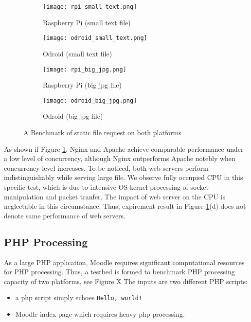 \begin{figure}[h]
\centering
\begin{subfigure}{0.45\textwidth}
\centering
\texttt{[image: rpi\_small\_text.png]}
\caption{Raspberry Pi (small text file)}
\end{subfigure}
\begin{subfigure}{0.45\textwidth}
\centering
\texttt{[image: odroid\_small\_text.png]}
\caption{Odroid (small text file)}
\end{subfigure}

\begin{subfigure}{0.45\textwidth}
\centering
\texttt{[image: rpi\_big\_jpg.png]}
\caption{Raspberry Pi (big jpg file)}
\end{subfigure}
\begin{subfigure}{0.45\textwidth}
\centering
\texttt{[image: odroid\_big\_jpg.png]}
\caption{Odroid (big jpg file)}
\end{subfigure}

\caption{A Benchmark of static file request on both platforms}
\label{static}
\end{figure}
As shown if Figure \ref{static}, Nginx and Apache achieve comparable performance under a low level of concurrency, although Nginx outperforms Apache notebly when concurrency level increases. To be noticed, both web servers perform indistinguishably while serving large file. We observe fully occupied CPU in this specific test, which is due to intensive OS kernel processing of socket manipulation and packet tranfer. The impact of web server on the CPU is neglectable in this circumstance. Thus, expirement result in Figure \ref{static}(d) does not denote same performance of web servers.

\subsection{PHP Processing}
As a large PHP application, Moodle requires significant computational resources for PHP processing. Thus, a testbed is formed to benchmark PHP processing capacity of two platforms, see Figure X
The inputs are two different PHP scripts:
\begin{itemize}
\item a php script simply echoes \texttt{Hello, world!}
\item Moodle index page which requires heavy php processing.
\end{itemize}

